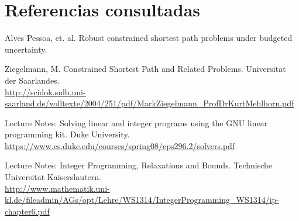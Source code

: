 \documentclass[a4paper,11pt]{article}
\theoremstyle{break}
\begin{document}
\section{Referencias consultadas}
	\begin{thebibliography}{99}		
		 Alves Pessoa, et. al. Robust constrained shortest path problems under budgeted uncertainty.
		
		 Ziegelmann, M. Constrained Shortest Path and Related Problems. Universitat der Saarlandes. \\
		\url{http://scidok.sulb.uni-saarland.de/volltexte/2004/251/pdf/MarkZiegelmann_ProfDrKurtMehlhorn.pdf}
		
		 Lecture Notes: Solving linear and integer programs using the GNU linear programming kit.  Duke University. \\ \url{https://www.cs.duke.edu/courses/spring08/cps296.2/solvers.pdf}
		
		 Lecture Notes: Integer Programming, Relaxations and Bounds. Technische Universitat Kaiserslautern. \\
		\url{http://www.mathematik.uni-kl.de/fileadmin/AGs/opt/Lehre/WS1314/IntegerProgramming_WS1314/ip-chapter6.pdf}
		
	\end{thebibliography}
	
\end{document}
